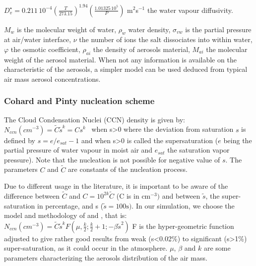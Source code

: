 $D_{v}^{\star }=0.211\, {10}^{-4}\left( \frac{T}{273.15} \right)^{1.94}\left(
\frac{1.01325\, {10}^{5}}{P} \right)$ m$^{2}$s$^{-1}$ the water vapour
diffusivity.

$M_{w}$ is the molecular weight of water, $\rho_{w}$ water density,
$\sigma_{vw}$ is the partial pressure at air/water interface,
\newline
$\nu $ the number of ions the salt dissociates into within water,
\newline
$\varphi $ the osmotic coefficient, $\rho_{ai}$ the density of aerosols material,
\newline
$M_{ai}$ the molecular weight of the aerosol material.
\newline
When not any information is available on the characteristic of the aerosols,
a simpler model can be used deduced from typical air mass aerosol
concentrations.

\subsubsection{Cohard and Pinty nucleation scheme}

The Cloud Condensation Nuclei (CCN) density is given by:
\newline
$N_{ccn}\left( {cm}^{-3} \right)=\tilde{C}\tilde{s}^{k}=Cs^{k}\, \, \, \, \,
$when s\textgreater 0
\newline
where the deviation from saturation $s$ is defined by $s = e/e_{sat} -1$ and
\newline
when s\textgreater 0 is called the supersaturation ($e$ being the partial
pressure of water vapour in moist air and $e_{sat}$ the saturation vapor
pressure). Note that the nucleation is not possible for negative value of $s$.
The parameters $C$ and $\tilde{C}$ are constants of the nucleation
process.

Due to different usage in the literature, it is important to be aware of the
difference between $\tilde{C}$ and $C=10^{2k}\tilde{C}$ (C is in cm$^{-3})$ and
between $\tilde{s}$, the super-saturation in percentage, and s
($\tilde{s}=100\mbox{s})$.
\newline
\newline
In our simulation, we choose the model and methodology of
\cite{Cohard:1998} and \cite{Cohard:2000}, that is: $N_{ccn}\left(
{cm}^{-3} \right)=\tilde{C}\tilde{s}^{k}F\left( \mu
,\frac{k}{2};\frac{k}{2}+1;-\beta \tilde{s}^{2} \right)$
\newline
F is the hyper-geometric function adjusted to give rather good results from
weak (s\textless 0.02{\%}) to significant (s\textgreater 1{\%})
super-saturation, as it could occur in the atmosphere. $\mu$, $\beta $ and $k$ are
some parameters characterizing the aerosols distribution of the air mass.


